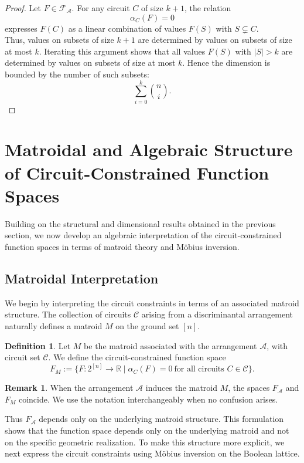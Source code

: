 \documentclass{amsart}
\theoremstyle{definition}
\newtheorem{definition}[theorem]{Definition}
\newtheorem{remark}[theorem]{Remark}
\begin{document}
\begin{proof}
Let $F \in \mathcal{F}_{\mathcal{A}}$. For any circuit $C$ of size $k+1$, the relation
\[
\alpha_C(F) = 0
\]
expresses $F(C)$ as a linear combination of values $F(S)$ with $S \subsetneq C$.\\
\noindent
Thus, values on subsets of size $k+1$ are determined by values on subsets of size at most $k$. Iterating this argument shows that all values $F(S)$ with $|S| > k$ are determined by values on subsets of size at most $k$. Hence the dimension is bounded by the number of such subsets:
\[
\sum_{i=0}^{k} \binom{n}{i}.
\]
\end{proof}

\section{Matroidal and Algebraic Structure of Circuit-Constrained Function Spaces}\label{sec:matroid}
Building on the structural and dimensional results obtained in the previous section, we now develop an algebraic interpretation of the circuit-constrained function spaces in terms of matroid theory and Möbius inversion.
\subsection{Matroidal Interpretation}
We begin by interpreting the circuit constraints in terms of an associated matroid structure. The collection of circuits $\mathcal{C}$ arising from a discriminantal arrangement
naturally defines a matroid $M$ on the ground set $[n]$.

\begin{definition}
Let $M$ be the matroid associated with the arrangement $\mathcal{A}$, with circuit set $\mathcal{C}$.
We define the circuit-constrained function space
\[
F_M := \{F : 2^{[n]} \to \mathbb{R} \mid \alpha_C(F) = 0 \ \text{for all circuits } C \in \mathcal{C} \}.
\]
\end{definition}
\begin{remark}
When the arrangement $\mathcal{A}$ induces the matroid $M$, the spaces $F_{\mathcal{A}}$ and $F_M$
coincide. We use the notation interchangeably when no confusion arises.
\end{remark}
\noindent
Thus $F_{\mathcal{A}}$ depends only on the underlying matroid structure. This formulation shows that the function space depends only on the underlying matroid and not on the specific geometric realization. To make this structure more explicit, we next express the circuit constraints using Möbius inversion on the Boolean lattice.
\end{document}
